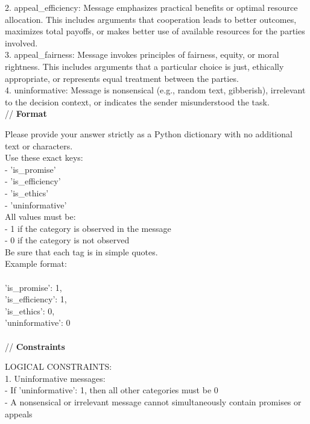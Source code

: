 \documentclass[11pt]{article}
\begin{document}
\begin{sloppypar}
\begin{appendices}
\begin{tcolorbox}
2. appeal\_efficiency: Message emphasizes practical benefits or optimal resource allocation. This includes arguments that cooperation leads to better outcomes, maximizes total payoffs, or makes better use of available resources for the parties involved.\\

3. appeal\_fairness: Message invokes principles of fairness, equity, or moral rightness. This includes arguments that a particular choice is just, ethically appropriate, or represents equal treatment between the parties.\\

4. uninformative: Message is nonsensical (e.g., random text, gibberish), irrelevant to the decision context, or indicates the sender misunderstood the task.\\


// \textbf{Format}

Please provide your answer strictly as a Python dictionary with no additional text or characters.\\

Use these exact keys:\\
- 'is\_promise'\\
- 'is\_efficiency'\\
- 'is\_ethics'\\
- 'uninformative'\\

All values must be:\\
- 1 if the category is observed in the message\\
- 0 if the category is not observed\\

Be sure that each tag is in simple quotes. \\
Example format:\\
{\\
    'is\_promise': 1,\\
    'is\_efficiency': 1,\\
    'is\_ethics': 0,\\
    'uninformative': 0\\
}\\


// \textbf{Constraints}

LOGICAL CONSTRAINTS:\\

1. Uninformative messages:\\
   - If 'uninformative': 1, then all other categories must be 0\\
   - A nonsensical or irrelevant message cannot simultaneously contain promises or appeals\\


\end{tcolorbox}
\end{appendices}
\end{sloppypar}
\end{document}
